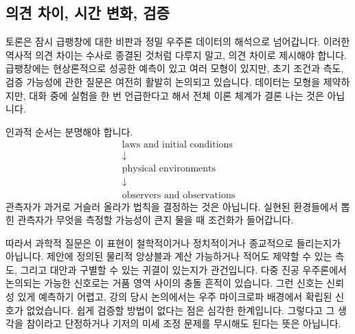 \subsection{의견 차이, 시간 변화, 검증}

토론은 잠시 급팽창에 대한 비판과 정밀 우주론 데이터의 해석으로 넘어갑니다. 이러한 역사적 의견 차이는 수사로 종결된 것처럼 다루지 말고, 의견 차이로 제시해야 합니다. 급팽창에는 현상론적으로 성공한 예측이 있고 여러 모형이 있지만, 초기 조건과 측도, 검증 가능성에 관한 질문은 여전히 활발히 논의되고 있습니다. 데이터는 모형을 제약하지만, 대화 중에 실험을 한 번 언급한다고 해서 전체 이론 체계가 결론 나는 것은 아닙니다.

\begin{classroomqa}
\end{classroomqa}

\begin{classroomqa}
\end{classroomqa}

인과적 순서는 분명해야 합니다.
\begin{equation}
\begin{gathered}
\text{laws and initial conditions}\\[-0.15em]
\downarrow\\[-0.15em]
\text{physical environments}\\[-0.15em]
\downarrow\\[-0.15em]
\text{observers and observations}
\end{gathered}
\end{equation}
관측자가 과거로 거슬러 올라가 법칙을 결정하는 것은 아닙니다. 실현된 환경들에서 뽑힌 관측자가 무엇을 측정할 가능성이 큰지 물을 때 조건화가 들어갑니다.

따라서 과학적 질문은 이 표현이 철학적이거나 정치적이거나 종교적으로 들리는지가 아닙니다. 제안에 정의된 물리적 앙상블과 계산 가능하거나 적어도 제약할 수 있는 측도, 그리고 대안과 구별할 수 있는 귀결이 있는지가 관건입니다. 다중 진공 우주론에서 논의되는 가능한 신호로는 거품 영역 사이의 충돌 흔적이 있습니다. 그런 신호는 신뢰성 있게 예측하기 어렵고, 강의 당시 논의에서는 우주 마이크로파 배경에서 확립된 신호가 없었습니다. 쉽게 검증할 방법이 없다는 점은 심각한 한계입니다. 그렇다고 그 생각을 참이라고 단정하거나 기저의 미세 조정 문제를 무시해도 된다는 뜻은 아닙니다.

